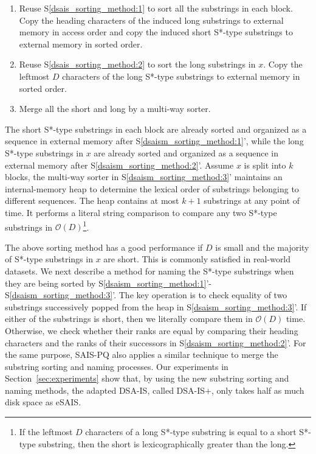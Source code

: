 \documentclass[10pt,journal,compsoc]{IEEEtran}
\begin{document}
\begin{enumerate}[S1']
	\item Reuse S\ref{dsais_sorting_method:1} to sort all the substrings in each block. Copy the heading characters of the induced long substrings to external memory in access order and copy the induced short S*-type substrings to external memory in sorted order.~\label{dsaism_sorting_method:1}
		
	\item Reuse S\ref{dsais_sorting_method:2} to sort the long substrings in $x$. Copy the leftmost $D$ characters of the long S*-type substrings to external memory in sorted order.~\label{dsaism_sorting_method:2}
	
	\item Merge all the short and long by a multi-way sorter.~\label{dsaism_sorting_method:3}
\end{enumerate}

The short S*-type substrings in each block are already sorted and organized as a sequence in external memory after S\ref{dsaism_sorting_method:1}', while the long S*-type substrings in $x$ are already sorted and organized as a sequence in external memory after S\ref{dsaism_sorting_method:2}'. Assume $x$ is split into $k$ blocks, the multi-way sorter in S\ref{dsaism_sorting_method:3}' maintains an internal-memory heap to determine the lexical order of substrings belonging to different sequences. The heap contains at most $k + 1$ substrings at any point of time. It performs a literal string comparison to compare any two S*-type substrings in $\mathcal{O}(D)$\footnote{If the leftmost $D$ characters of a long S*-type substring is equal to a short S*-type substring, then the short is lexicographically greater than the long.}. 

The above sorting method has a good performance if $D$ is small and the majority of S*-type substrings in $x$ are short. This is commonly satisfied in real-world datasets. We next describe a method for naming the S*-type substrings when they are being sorted by S\ref{dsaism_sorting_method:1}'-S\ref{dsaism_sorting_method:3}'. The key operation is to check equality of two substrings successively popped from the heap in S\ref{dsaism_sorting_method:3}'. If either of the substrings is short, then we literally compare them in $\mathcal{O}(D)$ time. Otherwise, we check whether their ranks are equal by comparing their heading characters and the ranks of their successors in S\ref{dsaism_sorting_method:2}'. For the same purpose, SAIS-PQ also applies a similar technique to merge the substring sorting and naming processes. Our experiments in Section~\ref{sec:experiments} show that, by using the new substring sorting and naming methods, the adapted DSA-IS, called DSA-IS+, only takes half as much disk space as eSAIS.
\end{document}

